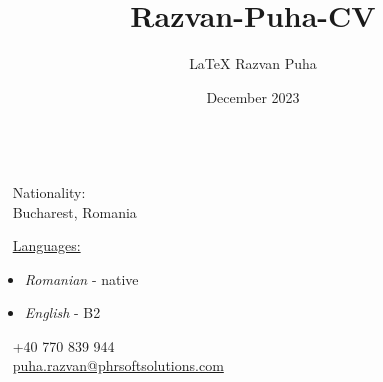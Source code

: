 \documentclass{modernsimplecv}
\title{Razvan-Puha-CV}
\author{\LaTeX{} Razvan Puha}
\date{December 2023}
\begin{document}
    \pagestyle{fancy}
    \fancyhf{} %
    \begin{minipage}[t]{\textwidth}
        \vspace{0pt} %
        \begin{shaded*}
            \begin{multicols}{2}
                \begin{minipage}[t]{0.4\textwidth}
                    \vspace{0pt} %
                    {
                        \par\centering\huge{}
                    } \\[0.3cm]
                    
                    \faGlobe~ Nationality:  \\
                    \faLocationArrow~ Bucharest, Romania \\
            
                    {
                        \small
                        \faComments~ \underline{Languages:} 
                        \begin{itemize}
                            \item \emph{Romanian} - native
                            \item \emph{English} - B2
                        \end{itemize}
                    }
                \end{minipage}
            
                \hfill
            
                \begin{minipage}[t]{0.4\textwidth}
                    \vspace{0pt} %
                    \vspace{1cm}
                    \faPhone~ +40 770 839 944 \\
                    \faAt~ \href{mailto:puha.razvan@phrsoftsolutions.com}{puha.razvan@phrsoftsolutions.com} \\
                    

\end{minipage}
\end{multicols}
\end{shaded*}
\end{minipage}
\end{document}
